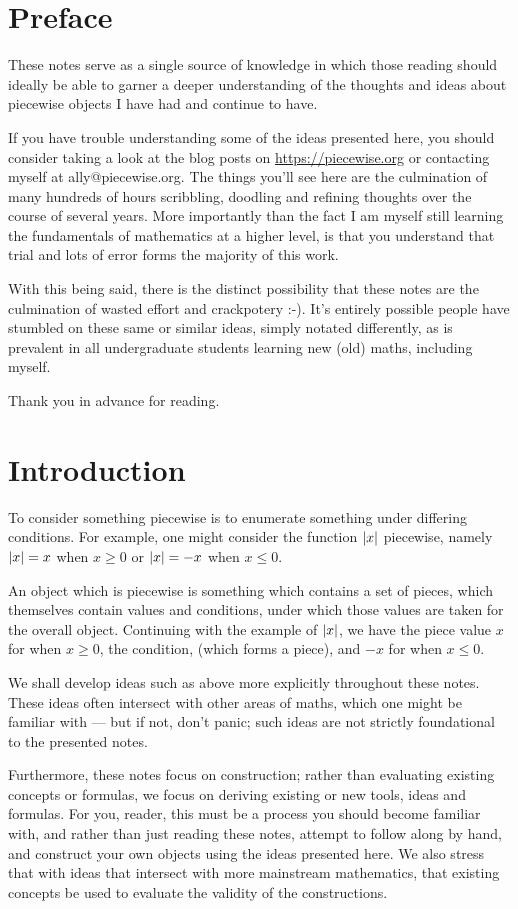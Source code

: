 \section*{Preface}
These notes serve as a single source of knowledge in which those reading should ideally be able to garner a deeper understanding of the thoughts and ideas about piecewise objects I have had and continue to have.

If you have trouble understanding some of the ideas presented here, you should consider taking a look at the blog posts on \url{https://piecewise.org} or contacting myself at ally@piecewise.org. The things you'll see here are the culmination of many hundreds of hours scribbling, doodling and refining thoughts over the course of several years. More importantly than the fact I am myself still learning the fundamentals of mathematics at a higher level, is that you understand that trial and lots of error forms the majority of this work.

With this being said, there is the distinct possibility that these notes are the culmination of wasted effort and crackpotery :-). It's entirely possible people have stumbled on these same or similar ideas, simply notated differently, as is prevalent in all undergraduate students learning new (old) maths, including myself.

Thank you in advance for reading.

\section{Introduction}
To consider something piecewise is to enumerate something under differing conditions. For example, one might consider the function $\abs{x}$ piecewise, namely $\abs{x}=x$ when $x\geq 0$ or $\abs{x}=-x$ when $x\leq 0$.

An object which is piecewise is something which contains a set of pieces, which themselves contain values and conditions, under which those values are taken for the overall object. Continuing with the example of $\abs{x}$, we have the piece value $x$ for when $x\geq 0$, the condition, (which forms a piece), and $-x$ for when $x\leq 0$.

We shall develop ideas such as above more explicitly throughout these notes. These ideas often intersect with other areas of maths, which one might be familiar with --- but if not, don't panic; such ideas are not strictly foundational to the presented notes.

Furthermore, these notes focus on construction; rather than evaluating existing concepts or formulas, we focus on deriving existing or new tools, ideas and formulas. For you, reader, this must be a process you should become familiar with, and rather than just reading these notes, attempt to follow along by hand, and construct your own objects using the ideas presented here. We also stress that with ideas that intersect with more mainstream mathematics, that existing concepts be used to evaluate the validity of the constructions.


\newpage